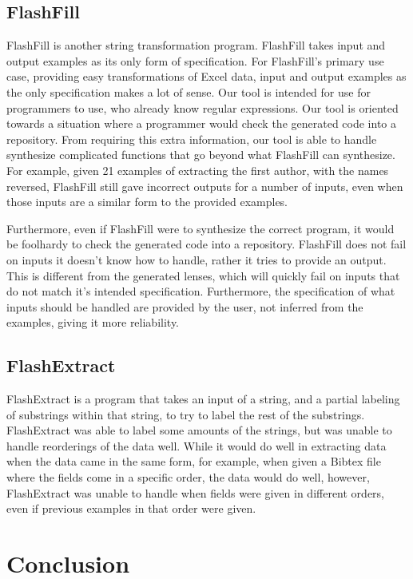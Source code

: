 \documentclass[numbers]{sigplanconf}
\begin{document}
\subsection{FlashFill}
FlashFill is another string transformation program.  FlashFill takes input and
output examples as its only form of specification.  For FlashFill's primary use
case, providing easy transformations of Excel data, input and output examples as
the only specification makes a lot of sense.  Our tool is intended for use for
programmers to use, who already know regular expressions.  Our tool is oriented
towards a situation where a programmer would check the generated code into a
repository.  From requiring this extra information, our tool is able to handle
synthesize complicated functions that go beyond what FlashFill can synthesize.
For example, given 21 examples of extracting the first author, with the names
reversed, FlashFill still gave incorrect outputs for a number of inputs, even
when those inputs are a similar form to the provided examples.

Furthermore, even if FlashFill were to synthesize the correct program, it would
be foolhardy to check the generated code into a repository.  FlashFill does not
fail on inputs it doesn't know how to handle, rather it tries to provide an
output.  This is different from the generated lenses, which will quickly
fail on inputs that do not match it's intended specification.  Furthermore, the
specification of what inputs should be handled are provided by the user, not
inferred from the examples, giving it more reliability. 

\subsection{FlashExtract}
FlashExtract is a program that takes an input of a string, and a partial
labeling of substrings within that string, to try to label the rest of the
substrings.  FlashExtract was able to label some amounts of the strings, but was
unable to handle reorderings of the data well.  While it would do well in
extracting data when the data came in the same form, for example, when given a
Bibtex file where the fields come in a specific order, the data would do well,
however, FlashExtract was unable to handle when fields were given in different
orders, even if previous examples in that order were given.

\section{Conclusion}
\end{document}
